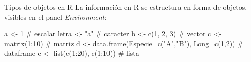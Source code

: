 \documentclass[
  9pt,
  ignorenonframetext,
]{beamer}
\newenvironment{Shaded}{\begin{snugshade}}{\end{snugshade}}
\newcommand{\AttributeTok}[1]{\textcolor[rgb]{0.40,0.45,0.13}{#1}}
\newcommand{\CommentTok}[1]{\textcolor[rgb]{0.37,0.37,0.37}{#1}}
\newcommand{\DecValTok}[1]{\textcolor[rgb]{0.68,0.00,0.00}{#1}}
\newcommand{\FunctionTok}[1]{\textcolor[rgb]{0.28,0.35,0.67}{#1}}
\newcommand{\NormalTok}[1]{\textcolor[rgb]{0.00,0.23,0.31}{#1}}
\newcommand{\OtherTok}[1]{\textcolor[rgb]{0.00,0.23,0.31}{#1}}
\newcommand{\SpecialCharTok}[1]{\textcolor[rgb]{0.37,0.37,0.37}{#1}}
\newcommand{\StringTok}[1]{\textcolor[rgb]{0.13,0.47,0.30}{#1}}
\begin{document}
\begin{frame}[fragile]{Tipos de objetos en R}
\label{tipos-de-objetos-en-r}
La información en R se estructura en forma de objetos, visibles en el
panel \emph{Environment}:

\begin{Shaded}
\begin{Highlighting}[]
\NormalTok{a     }\OtherTok{\textless{}{-}} \DecValTok{1}                                                 \CommentTok{\# escalar}
\NormalTok{letra }\OtherTok{\textless{}{-}} \StringTok{"a"}                                               \CommentTok{\# caracter}
\NormalTok{b     }\OtherTok{\textless{}{-}} \FunctionTok{c}\NormalTok{(}\DecValTok{1}\NormalTok{, }\DecValTok{2}\NormalTok{, }\DecValTok{3}\NormalTok{)                                        }\CommentTok{\# vector}
\NormalTok{c     }\OtherTok{\textless{}{-}} \FunctionTok{matrix}\NormalTok{(}\DecValTok{1}\SpecialCharTok{:}\DecValTok{10}\NormalTok{)                                      }\CommentTok{\# matriz}
\NormalTok{d     }\OtherTok{\textless{}{-}} \FunctionTok{data.frame}\NormalTok{(}\AttributeTok{Especie=}\FunctionTok{c}\NormalTok{(}\StringTok{"A"}\NormalTok{,}\StringTok{"B"}\NormalTok{), }\AttributeTok{Long=}\FunctionTok{c}\NormalTok{(}\DecValTok{1}\NormalTok{,}\DecValTok{2}\NormalTok{))       }\CommentTok{\# dataframe}
\NormalTok{e     }\OtherTok{\textless{}{-}} \FunctionTok{list}\NormalTok{(}\FunctionTok{c}\NormalTok{(}\DecValTok{1}\SpecialCharTok{:}\DecValTok{20}\NormalTok{), }\FunctionTok{c}\NormalTok{(}\DecValTok{1}\SpecialCharTok{:}\DecValTok{10}\NormalTok{))                            }\CommentTok{\# lista}
\end{Highlighting}
\end{Shaded}
\end{frame}
\end{document}
